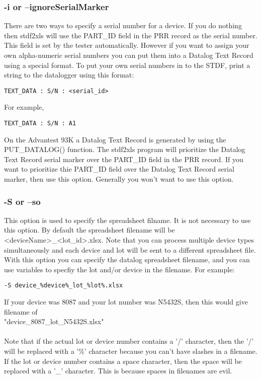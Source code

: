 \documentclass[letterpaper]{article}
\begin{document}
\subsubsection{-i or --ignoreSerialMarker}
There are two ways to specify a serial number for a device.  If you do nothing then stdf2xls
will use the PART\_ID field in the PRR record as the serial number.  This field is set by the tester
automatically. However if you want to assign your own alpha-numeric serial numbers you can put
them into a Datalog Text Record using a special format.  To put your own serial numbers
in to the STDF, print a string to the datalogger using this format:
\begin{verbatim}
TEXT_DATA : S/N : <serial_id>
\end{verbatim}
For example,
\begin{verbatim}
TEXT_DATA : S/N : A1
\end{verbatim}
On the Advantest 93K a Datalog Text Record is generated by using the PUT\_DATALOG() function.
The stdf2xls program will prioritize the Datalog Text Record serial marker over the
PART\_ID field in the PRR record.  If you want to prioritize thie PART\_ID field over
the Datalog Text Record serial marker, then use this option.  Generally you won't want
to use this option.

\subsubsection{-S or --so}
This option is used to specify the spreadsheet filname.  It is not necessary to use this option.
By default the spreadsheet filename will be <deviceName>\_<lot\_id>.xlsx.  Note that you can process
multiple device types simultaneously and each device and lot will be sent to a different spreadsheet
file.  With this option you can specify the datalog spreadsheet filename, and you can use variables
to specfiy the lot and/or device in the filename.  For example:
\begin{verbatim}
-S device_%device%_lot_%lot%.xlsx
\end{verbatim}
If your device was 8087 and your lot number was N5432S, then this would
give filename of\\ "device\_8087\_lot\_N5432S.xlsx"\\\\   Note that if the actual lot or device
number contains a '/' character, then the '/' will be replaced with a '\%' character
because you can't have slashes in a filename.  If the lot or device number contains
a space character, then the space will be replaced with a '\_' character.  This is because
spaces in filenames are evil.
\end{document}
